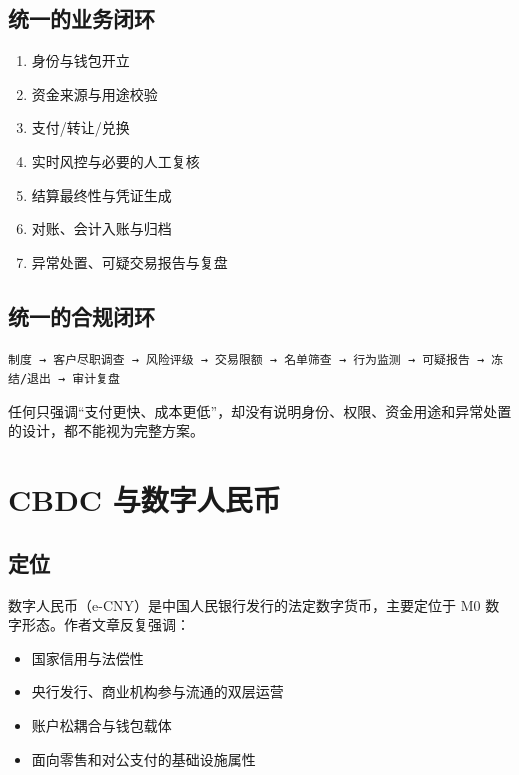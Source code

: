 \section{统一的业务闭环}\label{ux7edfux4e00ux7684ux4e1aux52a1ux95edux73af}

\begin{enumerate}
\def\labelenumi{\arabic{enumi}.}
\tightlist
\item
  身份与钱包开立
\item
  资金来源与用途校验
\item
  支付/转让/兑换
\item
  实时风控与必要的人工复核
\item
  结算最终性与凭证生成
\item
  对账、会计入账与归档
\item
  异常处置、可疑交易报告与复盘
\end{enumerate}

\section{统一的合规闭环}\label{ux7edfux4e00ux7684ux5408ux89c4ux95edux73af}

\texttt{制度\ →\ 客户尽职调查\ →\ 风险评级\ →\ 交易限额\ →\ 名单筛查\ →\ 行为监测\ →\ 可疑报告\ →\ 冻结/退出\ →\ 审计复盘}

任何只强调``支付更快、成本更低''，却没有说明身份、权限、资金用途和异常处置的设计，都不能视为完整方案。

\chapter{CBDC 与数字人民币}\label{cbdc-ux4e0eux6570ux5b57ux4ebaux6c11ux5e01}

\section{定位}\label{ux5b9aux4f4d}

数字人民币（e-CNY）是中国人民银行发行的法定数字货币，主要定位于 M0
数字形态。作者文章反复强调：

\begin{itemize}
\tightlist
\item
  国家信用与法偿性
\item
  央行发行、商业机构参与流通的双层运营
\item
  账户松耦合与钱包载体
\item
  面向零售和对公支付的基础设施属性
\end{itemize}

